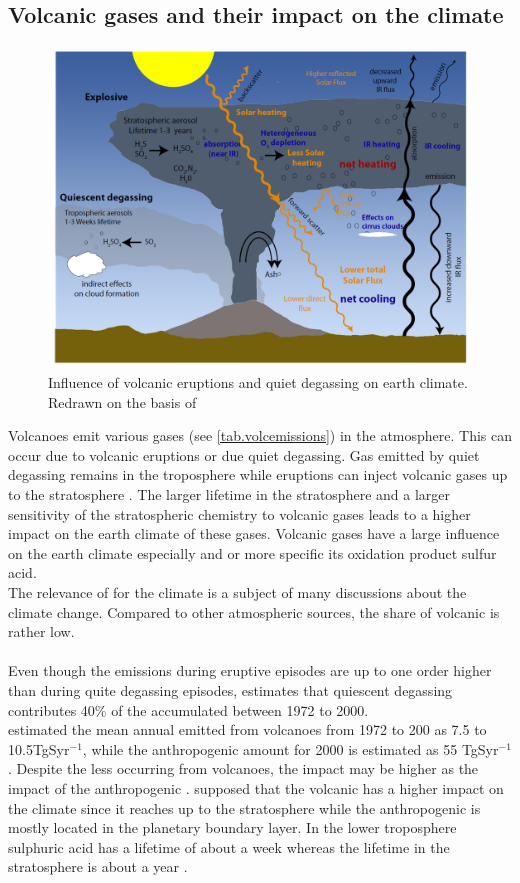 \documentclass  [
  paper    = a4,
  BCOR     = 10mm,
  twoside,
  fontsize = 12pt,
  fleqn,
  toc      = bibnumbered,
  toc      = listofnumbered,
  numbers  = noendperiod,
  headings = normal,
  listof   = leveldown,
  version  = 3.03
]                                       {scrreprt}
\begin{document}
\subsection*{Volcanic gases and their impact on the climate}
\begin{figure}
	\centering
	\includegraphics[width=0.8\linewidth]{Bilder/Simon/Bilder_Tung/Climate_Influence}
	\caption{Influence of volcanic eruptions and quiet degassing on earth climate. Redrawn on the basis of \citet{robock2000volcanic}}
	\label{fig:climateinfluence}
\end{figure}
Volcanoes emit various gases (see \cref{tab.volcemissions}) in the atmosphere. This can occur due to volcanic eruptions or due quiet degassing. Gas emitted by quiet degassing remains in the troposphere while eruptions can inject volcanic gases up to the stratosphere \citep{robock2000volcanic}. The larger lifetime in the stratosphere and a larger sensitivity of the stratospheric chemistry to volcanic gases leads to a higher impact on the earth climate of these gases.
Volcanic gases have a large influence on the earth climate especially  and   or more specific its oxidation product sulfur acid.\\ 
The relevance of   for the climate is a subject of many discussions about the climate change. Compared to other atmospheric  sources, the share of volcanic   is rather low.\\
\\
Even though the  emissions during eruptive episodes are up to one order higher than during quite degassing episodes, \citet{halmer2002annual} estimates that quiescent degassing contributes 40\% of the accumulated  between 1972 to 2000.\\
\citet{halmer2002annual} estimated the mean annual   emitted from volcanoes from 1972 to 200 as 7.5 to 10.5TgSyr$^{-1}$, while the anthropogenic   amount for 2000 is estimated as 55 TgSyr$^{-1}$ \citep{IPCC}. Despite the less   occurring from volcanoes, the impact may be higher as the impact of the anthropogenic . \citet{graf1997volcanic} supposed that the volcanic   has a higher impact on the climate since it reaches up to the stratosphere while the anthropogenic   is mostly located in the planetary boundary layer. In the lower troposphere sulphuric acid has a lifetime of about a week whereas the lifetime in the stratosphere is about a year \citep{IPCC}.\\
\end{document}
